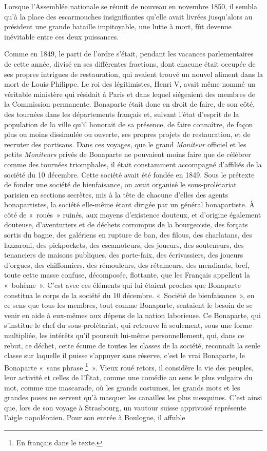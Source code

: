 \documentclass[french,twoside]{book} %
\begin{document}
Lorsque l’Assemblée nationale se réunit de nouveau en novembre 1850, il sembla qu’à la place des escarmouches insignifiantes qu’elle avait livrées jusqu’alors au président une grande bataille impitoyable, une lutte à mort, fût devenue inévitable entre ces deux puissances.\par
Comme en 1849, le parti de l’ordre s’était, pendant les vacances parlementaires de cette année, divisé en ses différentes fractions, dont chacune était occupée de ses propres intrigues de restauration, qui avaient trouvé un nouvel aliment dans la mort de Louis-Philippe. Le roi des légitimistes, Henri V, avait même nommé un véritable ministère qui résidait à Paris et dans lequel siégeaient des membres de la Commission permanente. Bonaparte était donc en droit de faire, de son côté, des tournées dans les départements français et, suivant l’état d’esprit de la population de la ville qu’il honorait de sa présence, de faire connaître, de façon plus ou moins dissimulée ou ouverte, ses propres projets de restauration, et de recruter des partisans. Dans ces voyages, que le grand \emph{Moniteur} officiel et les petits \emph{Moniteurs} privés de Bonaparte ne pouvaient moins faire que de célébrer comme des tournées triomphales, il était constamment accompagné d’affiliés de la société du 10 décembre. Cette société avait été fondée en 1849. Sous le prétexte de fonder une société de bienfaisance, on avait organisé le sous-prolétariat parisien en sections secrètes, mis à la tête de chacune d’elles des agents bonapartistes, la société elle-même étant dirigée par un général bonapartiste. À côté de « roués » ruinés, aux moyens d’existence douteux, et d’origine également douteuse, d’aventuriers et de déchets corrompus de la bourgeoisie, des forçats sortis du bagne, des galériens en rupture de ban, des filous, des charlatans, des lazzaroni, des pickpockets, des escamoteurs, des joueurs, des souteneurs, des tenanciers de maisons publiques, des porte-faix, des écrivassiers, des joueurs d’orgues, des chiffonniers, des rémouleurs, des rétameurs, des mendiants, bref, toute cette masse confuse, décomposée, flottante, que les Français appellent la « bohème ». C’est avec ces éléments qui lui étaient proches que Bonaparte constitua le corps de la société du 10 décembre. « Société de bienfaisance », en ce sens que tous les membres, tout comme Bonaparte, sentaient le besoin de se venir en aide à eux-mêmes aux dépens de la nation laborieuse. Ce Bonaparte, qui s’institue le chef du sous-prolétariat, qui retrouve là seulement, sous une forme multipliée, les intérêts qu’il poursuit lui-même personnellement, qui, dans ce rebut, ce déchet, cette écume de toutes les classes de la société, reconnaît la seule classe sur laquelle il puisse s’appuyer sans réserve, c’est le vrai Bonaparte, le Bonaparte « sans phrase \footnote{En français dans le texte.} ». Vieux roué retors, il considère la vie des peuples, leur activité et celles de l’État, comme une comédie au sens le plus vulgaire du mot, comme une mascarade, où les grands costumes, les grands mots et les grandes poses ne servent qu’à masquer les canailles les plus mesquines. C’est ainsi que, lors de son voyage à Strasbourg, un vautour suisse apprivoisé représente l’aigle napoléonien. Pour son entrée à Boulogne, il affuble 
\end{document}
